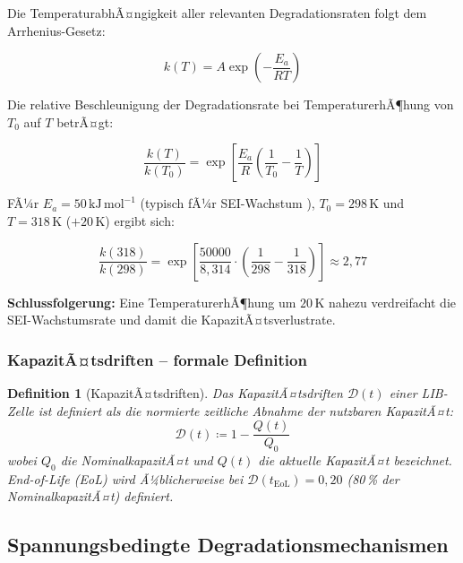 ﻿\documentclass[12pt,a4paper]{article}
\newtheorem{definition}{Definition}[section]
\begin{document}
	Die TemperaturabhÃ¤ngigkeit aller relevanten Degradationsraten folgt dem
	Arrhenius-Gesetz:
	
	\begin{equation}
		k(T) = A \exp\!\left(-\frac{E_a}{RT}\right)
		\label{eq:arrhenius}
	\end{equation}
	
	Die relative Beschleunigung der Degradationsrate bei TemperaturerhÃ¶hung von
	$T_0$ auf $T$ betrÃ¤gt:
	
	\begin{equation}
		\frac{k(T)}{k(T_0)} = \exp\!\left[\frac{E_a}{R}\left(\frac{1}{T_0}-\frac{1}{T}\right)\right]
		\label{eq:arrhenius_ratio}
	\end{equation}
	
	FÃ¼r $E_a = 50\,\mathrm{kJ\,mol^{-1}}$ (typisch fÃ¼r SEI-Wachstum \cite{Wang2011}),
	$T_0 = 298\,\mathrm{K}$ und $T = 318\,\mathrm{K}$ ($+20\,\mathrm{K}$) ergibt sich:
	
	\begin{equation}
		\frac{k(318)}{k(298)} = \exp\!\left[\frac{50000}{8{,}314}\cdot
		\left(\frac{1}{298}-\frac{1}{318}\right)\right] \approx 2{,}77
	\end{equation}
	
	\textbf{Schlussfolgerung:} Eine TemperaturerhÃ¶hung um $20\,\mathrm{K}$ nahezu
	verdreifacht die SEI-Wachstumsrate und damit die KapazitÃ¤tsverlustrate.
	
	\subsubsection{KapazitÃ¤tsdriften -- formale Definition}
	
	\begin{definition}[KapazitÃ¤tsdriften]
		Das KapazitÃ¤tsdriften $\mathcal{D}(t)$ einer LIB-Zelle ist definiert als
		die normierte zeitliche Abnahme der nutzbaren KapazitÃ¤t:
		\begin{equation}
			\mathcal{D}(t) \coloneqq 1 - \frac{Q(t)}{Q_0}
		\end{equation}
		wobei $Q_0$ die NominalkapazitÃ¤t und $Q(t)$ die aktuelle KapazitÃ¤t bezeichnet.
		\textit{End-of-Life} (EoL) wird Ã¼blicherweise bei $\mathcal{D}(t_\mathrm{EoL}) = 0{,}20$
		(80\,\% der NominalkapazitÃ¤t) definiert.
	\end{definition}
	
	\subsection{Spannungsbedingte Degradationsmechanismen}
	\label{subsec:volt_deg}
	
\end{document}
